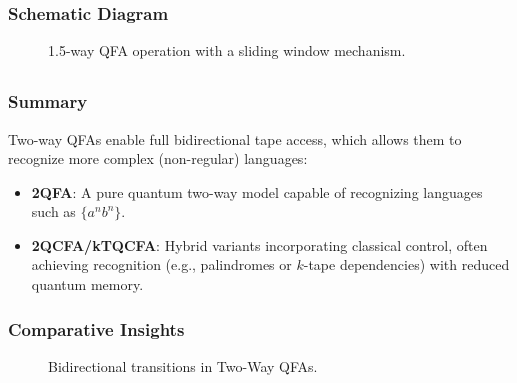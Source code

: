 \subsubsection{Schematic Diagram}
\begin{figure}[ht]
\centering
{}
\caption{1.5-way QFA operation with a sliding window mechanism.}
\label{fig:1.5qfa}
\end{figure}

\subsection*{}

\subsubsection{Summary}
Two-way QFAs enable full bidirectional tape access, which allows them to recognize more complex (non-regular) languages:
\begin{itemize}
    \item \textbf{2QFA}: A pure quantum two-way model capable of recognizing languages such as $\{a^nb^n\}$.
    \item \textbf{2QCFA/kTQCFA}: Hybrid variants incorporating classical control, often achieving recognition (e.g., palindromes or $k$-tape dependencies) with reduced quantum memory.
\end{itemize}

\subsubsection{Comparative Insights}
\begin{figure}[ht]
\centering
{}
\caption{Bidirectional transitions in Two-Way QFAs.}
\label{fig:two_way}
\end{figure}

